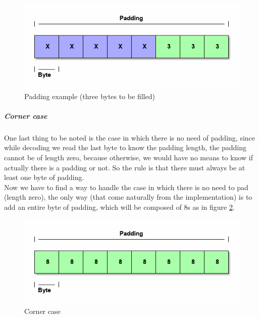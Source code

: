 \begin{figure}[H]
\centering
\includegraphics[scale = 0.5]{./Pictures/padding} %
\caption{Padding example (three bytes to be filled)}
\label{fig:padding}
\end{figure}

\subparagraph{Corner case}
One last thing to be noted is the case in which there is no need of padding, since while decoding we read the last byte to know the padding length, the padding cannot be of length zero, because otherwise, we would have no means to know if actually there is a padding or not. So the rule is that there must always be at least one byte of padding.\\
Now we have to find a way to handle the case in which there is no need to pad (length zero), the only way (that come naturally from the implementation) is to add an entire byte of padding, which will be composed of 8s as in figure \ref{fig:padding8}.

\begin{figure}[H]
\centering
\includegraphics[scale = 0.5]{./Pictures/padding8} %
\caption{Corner case}
\label{fig:padding8}
\end{figure}